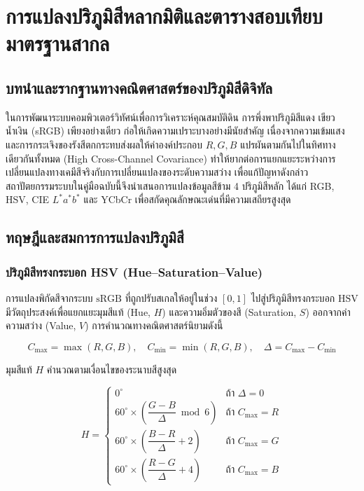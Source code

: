 \chapter{การแปลงปริภูมิสีหลากมิติและตารางสอบเทียบมาตรฐานสากล}
\label{ch:multi_color_space}

\section{บทนำและรากฐานทางคณิตศาสตร์ของปริภูมิสีดิจิทัล}

ในการพัฒนาระบบคอมพิวเตอร์วิทัศน์เพื่อการวิเคราะห์คุณสมบัติดิน การพึ่งพาปริภูมิสีแดง เขียว น้ำเงิน (sRGB) เพียงอย่างเดียว ก่อให้เกิดความเปราะบางอย่างมีนัยสำคัญ เนื่องจากความเข้มแสงและการกระเจิงของรังสีตกกระทบส่งผลให้ค่าองค์ประกอบ $R, G, B$ แปรผันตามกันไปในทิศทางเดียวกันทั้งหมด (High Cross-Channel Covariance) ทำให้ยากต่อการแยกแยะระหว่างการเปลี่ยนแปลงทางเคมีสีจริงกับการเปลี่ยนแปลงของระดับความสว่าง เพื่อแก้ปัญหาดังกล่าว สถาปัตยกรรมระบบในคู่มือฉบับนี้จึงนำเสนอการแปลงข้อมูลสีข้าม 4 ปริภูมิสีหลัก ได้แก่ RGB, HSV, CIE $L^*a^*b^*$ และ YCbCr เพื่อสกัดคุณลักษณะเด่นที่มีความเสถียรสูงสุด

\section{ทฤษฎีและสมการการแปลงปริภูมิสี}

\subsection{ปริภูมิสีทรงกระบอก HSV (Hue--Saturation--Value)}
การแปลงพิกัดสีจากระบบ $\text{sRGB}$ ที่ถูกปรับสเกลให้อยู่ในช่วง $[0, 1]$ ไปสู่ปริภูมิสีทรงกระบอก $\text{HSV}$ มีวัตถุประสงค์เพื่อแยกแยะมุมสีแท้ (Hue, $H$) และความอิ่มตัวของสี (Saturation, $S$) ออกจากค่าความสว่าง (Value, $V$) การคำนวณทางคณิตศาสตร์นิยามดังนี้

\begin{equation}
C_{\max} = \max(R, G, B), \quad C_{\min} = \min(R, G, B), \quad \Delta = C_{\max} - C_{\min}
\end{equation}

มุมสีแท้ $H$ คำนวณตามเงื่อนไขของระนาบสีสูงสุด

\begin{equation}
H = \begin{cases} 
0^\circ & \text{ถ้า } \Delta = 0 \\
60^\circ \times \left( \dfrac{G - B}{\Delta} \bmod 6 \right) & \text{ถ้า } C_{\max} = R \\
60^\circ \times \left( \dfrac{B - R}{\Delta} + 2 \right) & \text{ถ้า } C_{\max} = G \\
60^\circ \times \left( \dfrac{R - G}{\Delta} + 4 \right) & \text{ถ้า } C_{\max} = B
\end{cases}
\end{equation}

